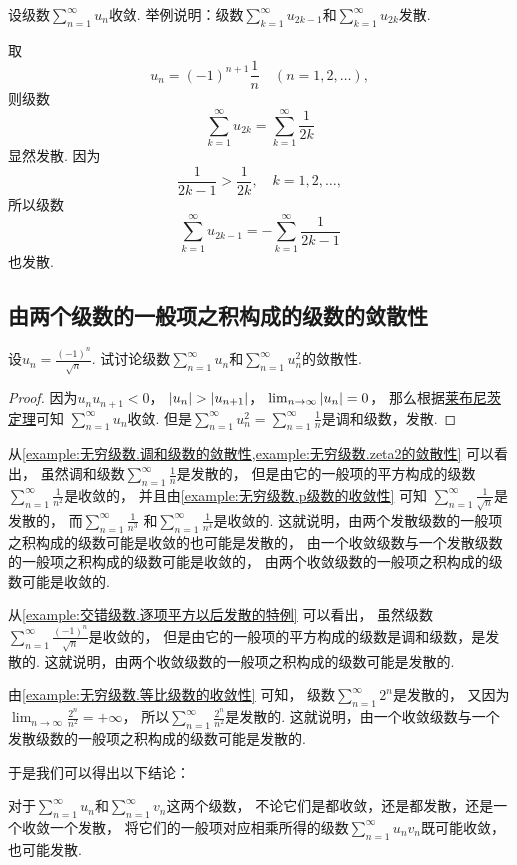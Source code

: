 \begin{example}
设级数\(\sum_{n=1}^\infty u_n\)收敛.
举例说明：级数\(\sum_{k=1}^\infty u_{2k-1}\)和\(\sum_{k=1}^\infty u_{2k}\)发散.
\begin{solution}
取\[
	u_n = (-1)^{n+1} \frac1n
	\quad(n=1,2,\dotsc),
\]
则级数\[
	\sum_{k=1}^\infty u_{2k}
	= \sum_{k=1}^\infty \frac1{2k}
\]显然发散.
因为\[
	\frac1{2k-1} > \frac1{2k},
	\quad k=1,2,\dotsc,
\]
所以级数\[
	\sum_{k=1}^\infty u_{2k-1}
	= -\sum_{k=1}^\infty \frac1{2k-1}
\]也发散.
\end{solution}
\end{example}

\subsection{由两个级数的一般项之积构成的级数的敛散性}
\begin{example}\label{example:交错级数.逐项平方以后发散的特例}
设\(u_n = \frac{(-1)^n}{\sqrt{n}}\).
试讨论级数\(\sum_{n=1}^\infty u_n\)和\(\sum_{n=1}^\infty u_n^2\)的敛散性.
\begin{proof}
因为\(u_n u_{n+1} < 0\)，
\(\abs{u_n} > \abs{u_{n+1}}\)，
\(\lim_{n\to\infty} \abs{u_n} = 0\)，
那么根据\hyperref[theorem:无穷级数.莱布尼茨定理]{莱布尼茨定理}可知
\(\sum_{n=1}^\infty u_n\)收敛.
但是\(\sum_{n=1}^\infty u_n^2
= \sum_{n=1}^\infty \frac{1}{n}\)是调和级数，发散.
\end{proof}
\end{example}

从\cref{example:无穷级数.调和级数的敛散性,example:无穷级数.zeta2的敛散性} 可以看出，
虽然调和级数\(\sum_{n=1}^\infty \frac1n\)是发散的，
但是由它的一般项的平方构成的级数\(\sum_{n=1}^\infty \frac1{n^2}\)是收敛的，
并且由\cref{example:无穷级数.p级数的收敛性} 可知
\(\sum_{n=1}^\infty \frac1{\sqrt{n}}\)是发散的，
而\(\sum_{n=1}^\infty \frac1{n^3}\)
和\(\sum_{n=1}^\infty \frac1{n^4}\)是收敛的.
这就说明，由两个发散级数的一般项之积构成的级数可能是收敛的也可能是发散的，
由一个收敛级数与一个发散级数的一般项之积构成的级数可能是收敛的，
由两个收敛级数的一般项之积构成的级数可能是收敛的.

从\cref{example:交错级数.逐项平方以后发散的特例} 可以看出，
虽然级数\(\sum_{n=1}^\infty \frac{(-1)^n}{\sqrt{n}}\)是收敛的，
但是由它的一般项的平方构成的级数是调和级数，是发散的.
这就说明，由两个收敛级数的一般项之积构成的级数可能是发散的.

由\cref{example:无穷级数.等比级数的收敛性} 可知，
级数\(\sum_{n=1}^\infty 2^n\)是发散的，
又因为\(\lim_{n\to\infty} \frac{2^n}{n^2} = +\infty\)，
所以\(\sum_{n=1}^\infty \frac{2^n}{n^2}\)是发散的.
这就说明，由一个收敛级数与一个发散级数的一般项之积构成的级数可能是发散的.

于是我们可以得出以下结论：
\begin{proposition}
对于\(\sum_{n=1}^\infty u_n\)和\(\sum_{n=1}^\infty v_n\)这两个级数，
不论它们是都收敛，还是都发散，还是一个收敛一个发散，
将它们的一般项对应相乘所得的级数\(\sum_{n=1}^\infty u_n v_n\)既可能收敛，也可能发散.
\end{proposition}

